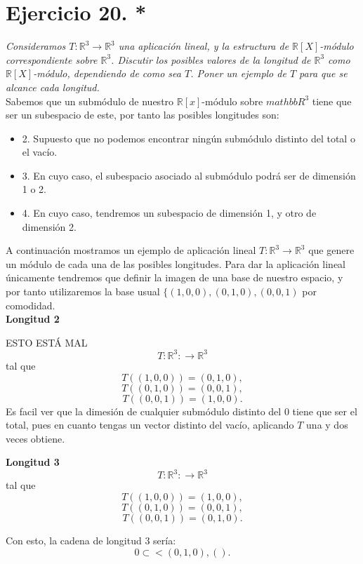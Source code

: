 \section{Ejercicio 20. *} \textit{Consideramos \(T:\mathbb{R}^3 \to
  \mathbb{R}^3\) una aplicación lineal, y la estructura de
  \(\mathbb{R}[X]\)-módulo correspondiente sobre \(\mathbb{R}^3\). Discutir los
  posibles valores de la longitud de \(\mathbb{R}^3\) como
  \(\mathbb{R}[X]\)-módulo, dependiendo de como sea \(T\). Poner un ejemplo de
  \(T\) para que se alcance cada longitud.}\\

Sabemos que un submódulo de nuestro \(\mathbb{R}[x]\)-módulo sobre \(mathbb{R}^3\) tiene  que ser un subespacio de este, por tanto las posibles longitudes son:
\begin{itemize}
    \item 2. Supuesto que no podemos encontrar ningún submódulo distinto del total o el vacío.
    \item 3. En cuyo caso, el subespacio asociado al submódulo podrá ser de dimensión 1 o 2.
    \item 4. En cuyo caso, tendremos un subespacio de dimensión 1, y otro de dimensión 2.
\end{itemize}

A continuación mostramos un ejemplo de aplicación lineal \(T:\mathbb{R}^3 \rightarrow \mathbb{R}^3\) que genere un módulo de cada una de las posibles longitudes.
Para dar la aplicación lineal únicamente tendremos que definir la imagen de una base de nuestro espacio, y por tanto utilizaremos la base usual
\(\{(1,0,0), (0,1,0), (0,0,1)\) por comodidad.\\

\textbf{Longitud 2}%

ESTO ESTÁ MAL
\[
T:\mathbb{R}^3: \rightarrow \mathbb{R}^3
\]
tal que
\[
T((1,0,0)) = (0,1,0),
\]
\[
T((0,1,0)) = (0,0,1),
\]
\[
T((0,0,1)) = (1,0,0)
.\]
Es facil ver que la dimesión de cualquier submódulo distinto del \({0}\) tiene que ser el total, pues en cuanto tengas un vector distinto del vacío, aplicando \(T\) una y dos veces obtiene.

\textbf{Longitud 3}
\[
T:\mathbb{R}^3: \rightarrow \mathbb{R}^3
\]
tal que
\[
T((1,0,0)) = (1,0,0),
\]
\[
T((0,1,0)) = (0,0,1),
\]
\[
T((0,0,1)) = (0,1,0)
.\]

Con esto, la cadena de longitud 3 sería:
\[
{0} \subset <(0,1,0), ()
.\]
